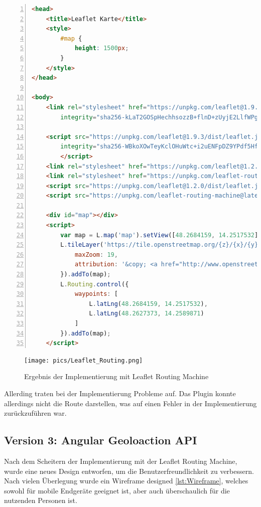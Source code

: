 \begin{lstlisting}[numbers=left,language=HTML,caption={Implementierung einer Karte mit Leaflet Routing Engine},label={lst:leafletmap}]
    <head>
    <title>Leaflet Karte</title>
    <style>
        #map {
            height: 1500px;
        }
    </style>
</head>

<body>
    <link rel="stylesheet" href="https://unpkg.com/leaflet@1.9.3/dist/leaflet.css"
        integrity="sha256-kLaT2GOSpHechhsozzB+flnD+zUyjE2LlfWPgU04xyI=" crossorigin="" />

    <script src="https://unpkg.com/leaflet@1.9.3/dist/leaflet.js"
        integrity="sha256-WBkoXOwTeyKclOHuWtc+i2uENFpDZ9YPdf5Hf+D7ewM=" crossorigin="">
        </script>
    <link rel="stylesheet" href="https://unpkg.com/leaflet@1.2.0/dist/leaflet.css" />
    <link rel="stylesheet" href="https://unpkg.com/leaflet-routing-machine@latest/dist/leaflet-routing-machine.css" />
    <script src="https://unpkg.com/leaflet@1.2.0/dist/leaflet.js"></script>
    <script src="https://unpkg.com/leaflet-routing-machine@latest/dist/leaflet-routing-machine.js"></script>

    <div id="map"></div>
    <script>
        var map = L.map('map').setView([48.2684159, 14.2517532], 15);
        L.tileLayer('https://tile.openstreetmap.org/{z}/{x}/{y}.png', {
            maxZoom: 19,
            attribution: '&copy; <a href="http://www.openstreetmap.org/copyright">OpenStreetMap</a>'
        }).addTo(map);
        L.Routing.control({
            waypoints: [
                L.latLng(48.2684159, 14.2517532),
                L.latLng(48.2627373, 14.2589871)
            ]
        }).addTo(map);
    </script>
\end{lstlisting}
\begin{figure}[h]
    \centering
    \texttt{[image: pics/Leaflet\_Routing.png]}
    \caption{Ergebnis der Implementierung mit Leaflet Routing Machine}
\end{figure}

Allerding traten bei der Implementierung Probleme auf. Das Plugin konnte allerdings nicht die Route darstellen, was auf einen Fehler in der Implementierung zurückzuführen war.

\subsection{Version 3: Angular Geoloaction API}
Nach dem Scheitern der Implementierung mit der Leaflet Routing Machine, wurde eine neues Design entworfen, um die Benutzerfreundlichkeit zu verbessern.
Nach vielen Überlegung wurde ein Wireframe designed \ref{lst:Wireframe}, welches sowohl für mobile Endgeräte geeignet ist, aber auch überschaulich für die nutzenden Personen ist.

